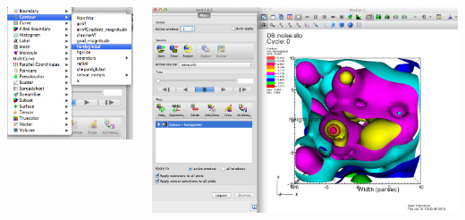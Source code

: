\begin{frame}
\begin{columns}
\begin{column}{5cm}
        \centering
        \includegraphics[width=\columnwidth]{figs/visit-pract/VisIt_contour}
\end{column}
\begin{column}{6.5cm}
        \centering
        \includegraphics[width=\columnwidth]{figs/visit-pract/VisIt_contour1a}
\end{column}
\end{columns}
\end{frame}



